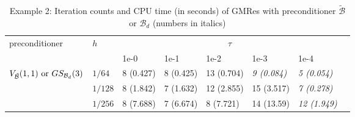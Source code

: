 \documentclass[smallcondensed]{svjour3}
\numberwithin{equation}{section} \numberwithin{table}{section}
\numberwithin{figure}{section}
\numberwithin{algorithm}{section}
\begin{document}
 \begin{table}
\caption{Example 2: Iteration counts and CPU time (in seconds) of GMRes with preconditioner $\tilde{\mathcal{B}}$ or ${\mathcal{B}_d}$ (numbers in italics)}
\begin{center}
\begin{tabularx}{\linewidth}{m{25mm} *7{X}}
\hline
 \multirow{2}{*}{preconditioner} & \multirow{2}{*}{$h$} &\multicolumn{5}{c}{$\tau$} \\
                          \cline{3-7}
                                        &   &1e-0&1e-1&1e-2&1e-3&1e-4\\ 
\hline
\multirow{3}{*}{$V_{\tilde{\mathcal{B}}}(1,1) \ {\rm or} \ GS_{\mathcal{B}_d}(3)$} 
&$1/64$ &   8 (0.427) &   8 (0.425) & 13 (0.704) & {\itshape9 (0.084)} & {\itshape 5 (0.054)} \\
&$1/128$  &   8 (1.842) &   7 (1.632) & 12 (2.855) & 15 (3.517) &{\itshape7 (0.278)} \\
&$1/256$  &   8 (7.688)  &   7 (6.674) & 8 (7.721) & 14 (13.59) & {\itshape 12 (1.949)} \\
\hline
\end{tabularx}
\end{center}
\label{GMRes-different-tau-ex2}
\end{table}
\end{document}
